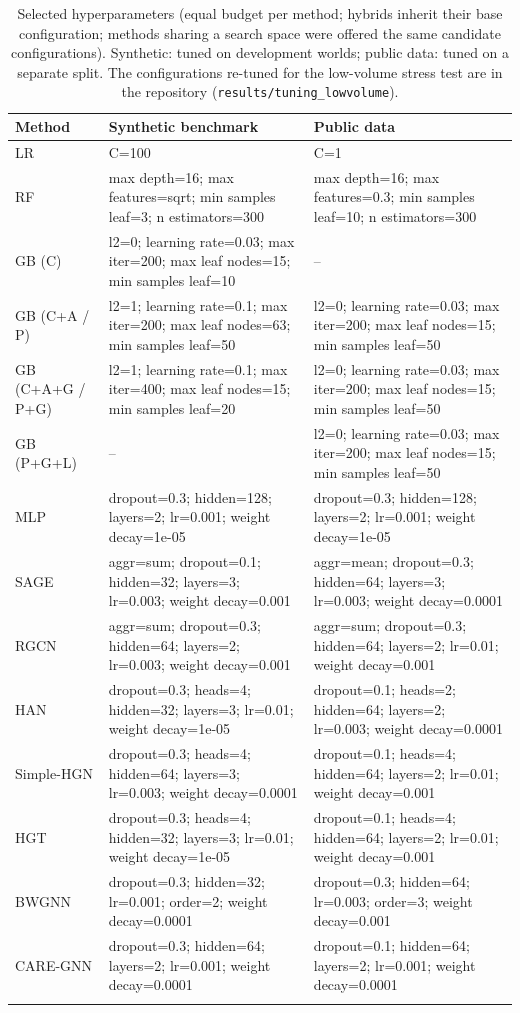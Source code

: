 \documentclass[pdflatex,sn-vancouver-num]{sn-jnl}
\begin{document}
\begin{table}[h]
\caption{Selected hyperparameters (equal budget per method; hybrids inherit their base configuration; methods sharing a search space were offered the same candidate configurations). Synthetic: tuned on development worlds; public data: tuned on a separate split. The configurations re-tuned for the low-volume stress test are in the repository (\texttt{results/tuning\_lowvolume}).}\label{tab:hyperparams}
\scriptsize
\begin{tabular}{@{}p{2.2cm}p{5.0cm}p{5.0cm}@{}}
\toprule
Method & Synthetic benchmark & Public data \\
\midrule
LR & C=100 & C=1 \\
RF & max depth=16; max features=sqrt; min samples leaf=3; n estimators=300 & max depth=16; max features=0.3; min samples leaf=10; n estimators=300 \\
GB (C) & l2=0; learning rate=0.03; max iter=200; max leaf nodes=15; min samples leaf=10 & -- \\
GB (C+A / P) & l2=1; learning rate=0.1; max iter=200; max leaf nodes=63; min samples leaf=50 & l2=0; learning rate=0.03; max iter=200; max leaf nodes=15; min samples leaf=50 \\
GB (C+A+G / P+G) & l2=1; learning rate=0.1; max iter=400; max leaf nodes=15; min samples leaf=20 & l2=0; learning rate=0.03; max iter=200; max leaf nodes=15; min samples leaf=50 \\
GB (P+G+L) & -- & l2=0; learning rate=0.03; max iter=200; max leaf nodes=15; min samples leaf=50 \\
MLP & dropout=0.3; hidden=128; layers=2; lr=0.001; weight decay=1e-05 & dropout=0.3; hidden=128; layers=2; lr=0.001; weight decay=1e-05 \\
SAGE & aggr=sum; dropout=0.1; hidden=32; layers=3; lr=0.003; weight decay=0.001 & aggr=mean; dropout=0.3; hidden=64; layers=3; lr=0.003; weight decay=0.0001 \\
RGCN & aggr=sum; dropout=0.3; hidden=64; layers=2; lr=0.003; weight decay=0.001 & aggr=sum; dropout=0.3; hidden=64; layers=2; lr=0.01; weight decay=0.001 \\
HAN & dropout=0.3; heads=4; hidden=32; layers=3; lr=0.01; weight decay=1e-05 & dropout=0.1; heads=2; hidden=64; layers=2; lr=0.003; weight decay=0.0001 \\
Simple-HGN & dropout=0.3; heads=4; hidden=64; layers=3; lr=0.003; weight decay=0.0001 & dropout=0.1; heads=4; hidden=64; layers=2; lr=0.01; weight decay=0.001 \\
HGT & dropout=0.3; heads=4; hidden=32; layers=3; lr=0.01; weight decay=1e-05 & dropout=0.1; heads=4; hidden=64; layers=2; lr=0.01; weight decay=0.001 \\
BWGNN & dropout=0.3; hidden=32; lr=0.001; order=2; weight decay=0.0001 & dropout=0.3; hidden=64; lr=0.003; order=3; weight decay=0.001 \\
CARE-GNN & dropout=0.3; hidden=64; layers=2; lr=0.001; weight decay=0.0001 & dropout=0.1; hidden=64; layers=2; lr=0.001; weight decay=0.0001 \\
\botrule
\end{tabular}
\end{table}
\end{document}
